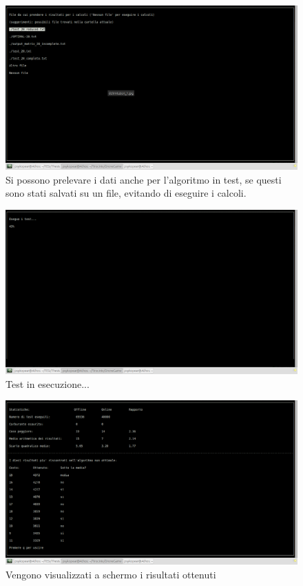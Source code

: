 \begin{figure}[hb]
\center
\includegraphics[width=\textwidth]{immagini/test3.png}
\caption{Si possono prelevare i dati anche per l'algoritmo in test, se questi sono stati salvati su un file, evitando di eseguire i calcoli.}
\end{figure}

\begin{figure}[hb]
\center
\includegraphics[width=\textwidth]{immagini/test5.png}
\caption{Test in esecuzione...}
\end{figure}

\begin{figure}[hb]
\center
\includegraphics[width=\textwidth]{immagini/Results.png}
\caption{Vengono visualizzati a schermo i risultati ottenuti}
\end{figure}